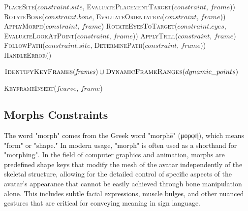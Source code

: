 \documentclass[../../main.tex]{subfiles}
\begin{document}
\begin{algorithm}
\begin{algorithmic}[1]
                \State \textsc{PlaceSite}($constraint.site$, \textsc{EvaluatePlacementTarget}($constraint$, $frame$))
                \State \textsc{RotateBone}($constraint.bone$, \textsc{EvaluateOrientation}($constraint$, $frame$))
                \State \textsc{ApplyMorph}($constraint$, $frame$)
                \State \textsc{RotateEyesToTarget}($constraint.eyes$, \textsc{EvaluateLookAtPoint}($constraint$, $frame$))
                \State \textsc{ApplyTrill}($constraint$, $frame$)
                \State \textsc{FollowPath}($constraint.site$, \textsc{DeterminePath}($constraint$, $frame$))
            \Else
                \State \textsc{HandleError}()
            \EndIf
        \EndProcedure
        
            \State \Return $\textsc{IdentifyKeyFrames}(\mathit{frames}) \cup \textsc{DynamicFrameRanges}(dynamic\_points)$
        \EndProcedure
        
                \State \textsc{KeyframeInsert}($fcurve$, $frame$)
            \EndFor
        \EndProcedure
    \end{algorithmic}
\end{algorithm}

\subsection{Morphs Constraints}

The word "morph" comes from the Greek word "morphē" (μορφή), which means "form" or "shape." In modern usage, "morph" is often used as a shorthand for "morphing". In the field of computer graphics and animation, morphs are predefined shape keys that modify the mesh of the avatar independently of the skeletal structure, allowing for the detailed control of specific aspects of the avatar's appearance that cannot be easily achieved through bone manipulation alone. This includes subtle facial expressions, muscle bulges, and other nuanced gestures that are critical for conveying meaning in sign language.
\end{document}
